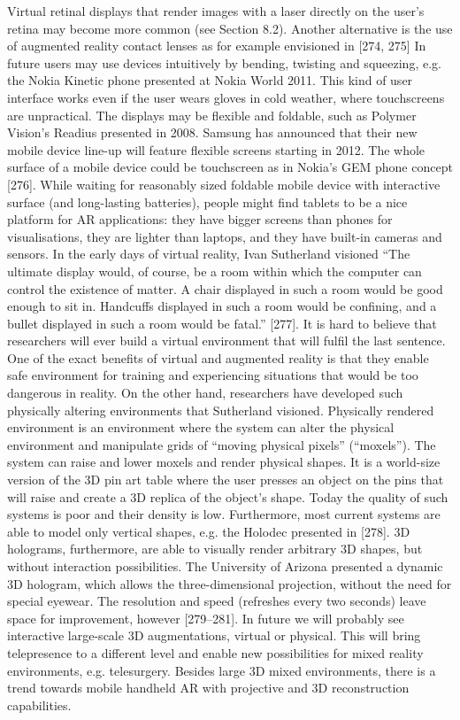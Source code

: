 Virtual retinal displays that render images with a laser directly on the user’s retina may become more common (see Section 8.2). Another alternative is the use of augmented reality contact lenses as for example envisioned in [274, 275] In future users may use devices intuitively by bending, twisting and squeezing, e.g. the Nokia Kinetic phone presented at Nokia World 2011. This kind of user interface works even if the user wears gloves in cold weather, where touchscreens are unpractical. The displays may be flexible and foldable, such as Polymer Vision’s Readius presented in 2008. Samsung has announced that their new mobile device line-up will feature flexible screens starting in 2012. The whole surface of a mobile device could be touchscreen as in Nokia’s GEM phone concept [276]. While waiting for reasonably sized foldable mobile device with interactive surface (and long-lasting batteries), people might find tablets to be a nice platform for AR applications: they have bigger screens than phones for visualisations, they are lighter than laptops, and they have built-in cameras and sensors. In the early days of virtual reality, Ivan Sutherland visioned “The ultimate display would, of course, be a room within which the computer can control the existence of matter. A chair displayed in such a room would be good enough to sit in. Handcuffs displayed in such a room would be confining, and a bullet displayed in such a room would be fatal.” [277]. It is hard to believe that researchers will ever build a virtual environment that will fulfil the last sentence. One of the exact benefits of virtual and augmented reality is that they enable safe environment for training and experiencing situations that would be too dangerous in reality. On the other hand, researchers have developed such physically altering environments that Sutherland visioned. Physically rendered environment is an environment where the system can alter the physical environment and manipulate grids of “moving physical pixels” (“moxels”). The system can raise and lower moxels and render physical shapes. It is a world-size version of the 3D pin art table where the user presses an object on the pins that will raise and create a 3D replica of the object’s shape. Today the quality of such systems is poor and their density is low. Furthermore, most current systems are able to model only vertical shapes, e.g. the Holodec presented in [278]. 3D holograms, furthermore, are able to visually render arbitrary 3D shapes, but without interaction possibilities. The University of Arizona presented a dynamic 3D hologram, which allows the three-dimensional projection, without the need for special eyewear. The resolution and speed (refreshes every two seconds) leave space for improvement, however [279–281]. In future we will probably see interactive large-scale 3D augmentations, virtual or physical. This will bring telepresence to a different level and enable new possibilities for mixed reality environments, e.g. telesurgery. Besides large 3D mixed environments, there is a trend towards mobile handheld AR with projective and 3D reconstruction capabilities.



